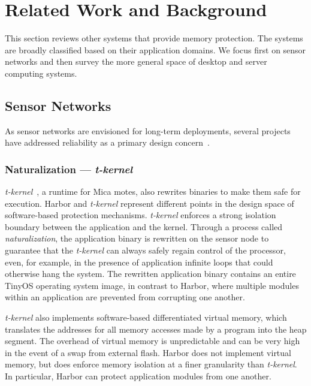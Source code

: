 \section{Related Work and Background}
\label{sec:related}
%
This section reviews other systems that provide memory protection.
%
The systems are broadly classified based on their application
domains.
%
We focus first on sensor networks and then survey the more general
space of desktop and server computing systems.
%
%
\subsection{Sensor Networks}
%
As sensor networks are envisioned for long-term deployments, several
projects have addressed reliability as a primary design
concern~\cite{tkernel06sensys,regehr06utos,dutta05ipsn}.
\subsubsection{Naturalization --- \emph{t-kernel}}
%
\emph{t-kernel}~\cite{tkernel06sensys}, a runtime for Mica motes, also
rewrites binaries to make them safe for execution.
%
Harbor and \emph{t-kernel} represent different points in the design space of
software-based protection mechanisms.
%
\emph{t-kernel} enforces a strong isolation boundary between the application and
the kernel.
%
Through a process called \emph{naturalization}, the application binary is
rewritten on the sensor node to guarantee that the \emph{t-kernel} can
always safely regain control of the processor, even, for example, in the
presence of application infinite loops that could otherwise hang the
system.
%
The rewritten application binary contains an entire TinyOS operating system
image, in contrast to Harbor, where multiple modules within an
application are prevented from corrupting one another.
%


\emph{t-kernel} also implements software-based differentiated
virtual memory,
%
which translates the addresses for all memory accesses made by a program
into the heap segment.
%
The overhead of virtual memory is unpredictable and can be very
high in the event of a swap from external flash.
%
Harbor does not implement virtual memory, but does enforce memory isolation at a
finer granularity than \emph{t-kernel}.
%
In particular, Harbor can protect application modules from
one another.
%

